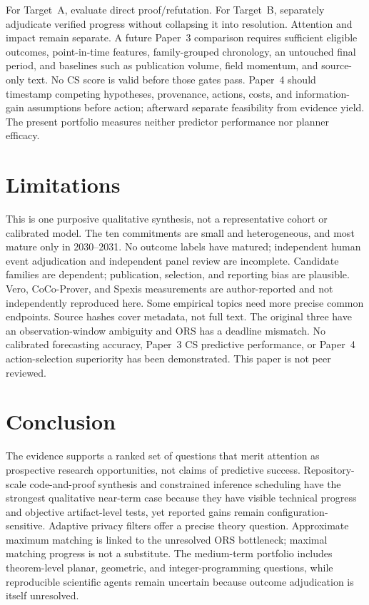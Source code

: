 \documentclass[11pt]{article}
\begin{document}
For Target~A, evaluate direct proof/refutation. For Target~B, separately adjudicate verified progress without collapsing it into resolution. Attention and impact remain separate. A future Paper~3 comparison requires sufficient eligible outcomes, point-in-time features, family-grouped chronology, an untouched final period, and baselines such as publication volume, field momentum, and source-only text. No CS score is valid before those gates pass. Paper~4 should timestamp competing hypotheses, provenance, actions, costs, and information-gain assumptions before action; afterward separate feasibility from evidence yield. The present portfolio measures neither predictor performance nor planner efficacy.

\section{Limitations}
This is one purposive qualitative synthesis, not a representative cohort or calibrated model. The ten commitments are small and heterogeneous, and most mature only in 2030--2031. No outcome labels have matured; independent human event adjudication and independent panel review are incomplete. Candidate families are dependent; publication, selection, and reporting bias are plausible. Vero, CoCo-Prover, and Spexis measurements are author-reported and not independently reproduced here. Some empirical topics need more precise common endpoints. Source hashes cover metadata, not full text. The original three have an observation-window ambiguity and ORS has a deadline mismatch. No calibrated forecasting accuracy, Paper~3 CS predictive performance, or Paper~4 action-selection superiority has been demonstrated. This paper is not peer reviewed.

\section{Conclusion}
The evidence supports a ranked set of questions that merit attention as prospective research opportunities, not claims of predictive success. Repository-scale code-and-proof synthesis and constrained inference scheduling have the strongest qualitative near-term case because they have visible technical progress and objective artifact-level tests, yet reported gains remain configuration-sensitive. Adaptive privacy filters offer a precise theory question. Approximate maximum matching is linked to the unresolved ORS bottleneck; maximal matching progress is not a substitute. The medium-term portfolio includes theorem-level planar, geometric, and integer-programming questions, while reproducible scientific agents remain uncertain because outcome adjudication is itself unresolved.
\end{document}
